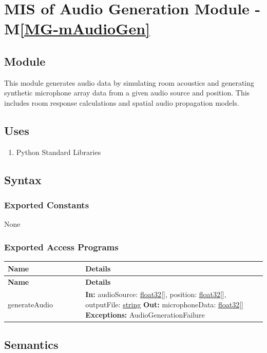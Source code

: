 \documentclass[12pt, titlepage]{article}
\newcommand{\mref}[1]{M\ref{#1}}
\newenvironment{apitable}{%
\begin{center}
\begin{longtable}{|p{0.3\linewidth}|p{0.7\linewidth}|} 
\hline
\textbf{Name} & \textbf{Details} \\
\hline
\endfirsthead
\hline
\textbf{Name} & \textbf{Details} \\
\hline
\endhead
\hline
\endfoot
\hline
\endlastfoot
}{%
\end{longtable}
\end{center}
}
\newcommand{\apifunc}[4]{%
#1 & 
\textbf{In:} #2 \newline
\textbf{Out:} #3 \newline
\textbf{Exceptions:} #4 \\
\hline
}
\begin{document}
\newpage

\section{MIS of Audio Generation Module - \mref{MG-mAudioGen}}
\label{mod:AudioGen}

\subsection{Module}

This module generates audio data by simulating room acoustics and generating
synthetic microphone array data from a given audio source and position. This
includes room response calculations and spatial audio propagation models. 

\subsection{Uses}

\begin{enumerate}
  \item Python Standard Libraries
\end{enumerate}

\subsection{Syntax}

\subsubsection{Exported Constants}

None

\subsubsection{Exported Access Programs}
\begin{apitable}
  \apifunc{generateAudio}
    {audioSource: \hyperref[generic:float32]{float32}[],
    position: \hyperref[generic:float32]{float32}[],
    outputFile: \hyperref[generic:string]{string}}
    {microphoneData: \hyperref[generic:float32]{float32}[]}
    {AudioGenerationFailure}
\end{apitable}

\subsection{Semantics}
\end{document}

